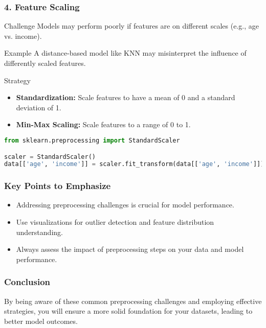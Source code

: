 \documentclass{beamer}
\begin{document}
\begin{frame}[fragile]
    \frametitle{4. Feature Scaling}
    \begin{block}{Challenge}
        Models may perform poorly if features are on different scales (e.g., age vs. income).
    \end{block}
    
    \begin{block}{Example}
        A distance-based model like KNN may misinterpret the influence of differently scaled features.
    \end{block}

    \begin{block}{Strategy}
        \begin{itemize}
            \item \textbf{Standardization:} Scale features to have a mean of 0 and a standard deviation of 1.
            \item \textbf{Min-Max Scaling:} Scale features to a range of 0 to 1.
        \end{itemize}
    \end{block}

    \begin{lstlisting}[language=Python]
from sklearn.preprocessing import StandardScaler

scaler = StandardScaler()
data[['age', 'income']] = scaler.fit_transform(data[['age', 'income']])  # Standardizing features
    \end{lstlisting}
\end{frame}

\begin{frame}[fragile]
    \frametitle{Key Points to Emphasize}
    \begin{itemize}
        \item Addressing preprocessing challenges is crucial for model performance.
        \item Use visualizations for outlier detection and feature distribution understanding.
        \item Always assess the impact of preprocessing steps on your data and model performance.
    \end{itemize}
\end{frame}

\begin{frame}[fragile]
    \frametitle{Conclusion}
    By being aware of these common preprocessing challenges and employing effective strategies, you will ensure a more solid foundation for your datasets, leading to better model outcomes.
\end{frame}
\end{document}
